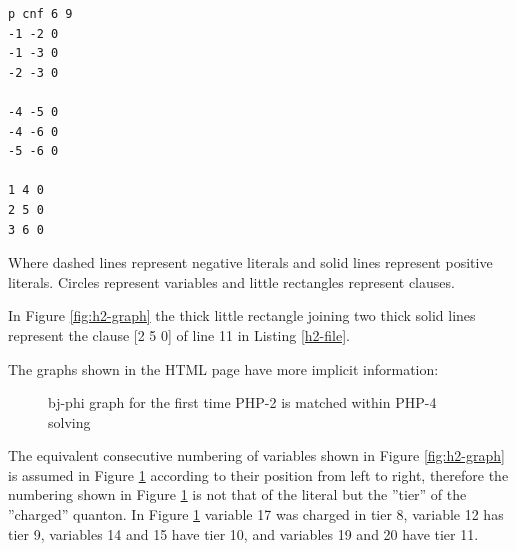 \documentclass{easychair}
\newcommand{\quanton}{\textsf{quanton}}
\begin{document}
\begin{lstlisting}[label=h2-file, caption=PHP of size 2 DIMACS file,]
p cnf 6 9
-1 -2 0
-1 -3 0
-2 -3 0

-4 -5 0
-4 -6 0
-5 -6 0

1 4 0
2 5 0
3 6 0
\end{lstlisting}

Where dashed lines represent negative literals and solid lines represent positive literals. Circles represent variables and little rectangles represent clauses.

In Figure \ref{fig:h2-graph} the thick little rectangle joining two thick solid lines  represent the clause [2 5 0] of line 11 in Listing \ref{h2-file}.

The graphs shown in the HTML page have more implicit information:

\begin{figure}[H]
	\begin{centering}
		\caption{bj-phi graph for the first time PHP-2 is matched within PHP-4 solving}
		\label{fig:h4-f1}
	\end{centering}
\end{figure}

The equivalent consecutive numbering of variables shown in Figure \ref{fig:h2-graph} is assumed in Figure \ref{fig:h4-f1} according to their position from left to right, therefore the numbering shown in Figure \ref{fig:h4-f1} is not that of the literal but the ''tier'' of the ''charged'' {\quanton}. In Figure \ref{fig:h4-f1} variable 17 was charged in tier 8, variable 12 has tier 9, variables 14 and 15 have tier 10, and variables 19 and 20 have tier 11.
\end{document}
